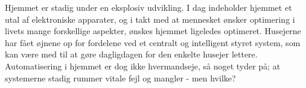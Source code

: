 Hjemmet er stadig under en eksplosiv udvikling. I dag indeholder hjemmet et utal af elektroniske apparater, og i takt med at mennesket ønsker optimering i livets mange forskellige aspekter, ønskes hjemmet ligeledes optimeret. Husejerne har fået øjnene op for fordelene ved et centralt og intelligent styret system, som kan være med til at gøre dagligdagen for den enkelte husejer lettere\cite{ZensehomeKunder}. Automatisering i hjemmet er dog ikke hvermandseje, så noget tyder på; at systemerne stadig rummer vitale fejl og mangler - men hvilke?

